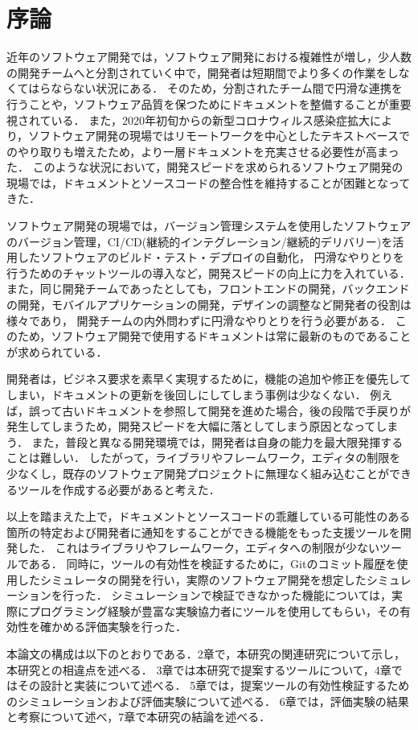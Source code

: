 \chapter{序論}
近年のソフトウェア開発では，ソフトウェア開発における複雑性が増し，少人数の開発チームへと分割されていく中で，開発者は短期間でより多くの作業をしなくてはらならない状況にある．
そのため，分割されたチーム間で円滑な連携を行うことや，ソフトウェア品質を保つためにドキュメントを整備することが重要視されている\cite{maintenance}．
また，2020年初旬からの新型コロナウィルス感染症拡大により，ソフトウェア開発の現場ではリモートワークを中心としたテキストベースでのやり取りも増えたため，より一層ドキュメントを充実させる必要性が高まった．
このような状況において，開発スピードを求められるソフトウェア開発の現場では，ドキュメントとソースコードの整合性を維持することが困難となってきた．

ソフトウェア開発の現場では，バージョン管理システムを使用したソフトウェアのバージョン管理，CI/CD(継続的インテグレーション/継続的デリバリー)を活用したソフトウェアのビルド・テスト・デプロイの自動化，
円滑なやりとりを行うためのチャットツールの導入など，開発スピードの向上に力を入れている．
また，同じ開発チームであったとしても，フロントエンドの開発，バックエンドの開発，モバイルアプリケーションの開発，デザインの調整など開発者の役割は様々であり，
開発チームの内外問わずに円滑なやりとりを行う必要がある．
このため，ソフトウェア開発で使用するドキュメントは常に最新のものであることが求められている．

開発者は，ビジネス要求を素早く実現するために，機能の追加や修正を優先してしまい，ドキュメントの更新を後回しにしてしまう事例は少なくない．
例えば，誤って古いドキュメントを参照して開発を進めた場合，後の段階で手戻りが発生してしまうため，開発スピードを大幅に落としてしまう原因となってしまう．
また，普段と異なる開発環境では，開発者は自身の能力を最大限発揮することは難しい．
したがって，ライブラリやフレームワーク，エディタの制限を少なくし，既存のソフトウェア開発プロジェクトに無理なく組み込むことができるツールを作成する必要があると考えた．

以上を踏まえた上で，ドキュメントとソースコードの乖離している可能性のある箇所の特定および開発者に通知をすることができる機能をもった支援ツールを開発した．
これはライブラリやフレームワーク，エディタへの制限が少ないツールである．
同時に，ツールの有効性を検証するために，Gitのコミット履歴を使用したシミュレータの開発を行い，実際のソフトウェア開発を想定したシミュレーションを行った．
シミュレーションで検証できなかった機能については，実際にプログラミング経験が豊富な実験協力者にツールを使用してもらい，その有効性を確かめる評価実験を行った．

本論文の構成は以下のとおりである．2章で，本研究の関連研究について示し，本研究との相違点を述べる．
3章では本研究で提案するツールについて，4章ではその設計と実装について述べる．
5章では，提案ツールの有効性検証するためのシミュレーションおよび評価実験について述べる．
6章では，評価実験の結果と考察について述べ，7章で本研究の結論を述べる．